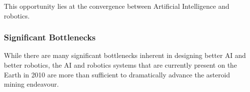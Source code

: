 \documentclass[english]{article}
\begin{document}
This opportunity lies at the convergence between Artificial Intelligence
and robotics.


\subsubsection{Significant Bottlenecks}

While there are many significant bottlenecks inherent in designing
better AI and better robotics, the AI and robotics systems that are
currently present on the Earth in 2010 are more than sufficient to
dramatically advance the asteroid mining endeavour.



\end{document}
